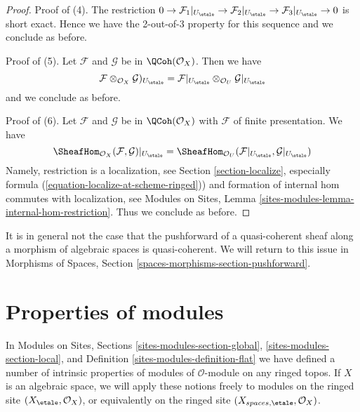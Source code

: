 \begin{proof}
\medskip\noindent
Proof of (4). The restriction
$0 \to \mathcal{F}_1|_{U_\etale} \to \mathcal{F}_2|_{U_\etale}
\to \mathcal{F}_3|_{U_\etale} \to 0$
is short exact. Hence we have the 2-out-of-3 property
for this sequence and we conclude as before.

\medskip\noindent
Proof of (5). Let $\mathcal{F}$ and $\mathcal{G}$ be in $\QCoh(\mathcal{O}_X)$.
Then we have
$$
\mathcal{F} \otimes_{\mathcal{O}_X} \mathcal{G})_{U_\etale} =
\mathcal{F}|_{U_\etale} \otimes_{\mathcal{O}_U} \mathcal{G}|_{U_\etale}
$$
and we conclude as before.

\medskip\noindent
Proof of (6). Let $\mathcal{F}$ and $\mathcal{G}$
be in $\QCoh(\mathcal{O}_X)$ with $\mathcal{F}$
of finite presentation. We have
$$
\SheafHom_{\mathcal{O}_X}(\mathcal{F}, \mathcal{G})|_{U_\etale} =
\SheafHom_{\mathcal{O}_U}(\mathcal{F}|_{U_\etale}, \mathcal{G}|_{U_\etale})
$$
Namely, restriction is a localization, see
Section \ref{section-localize}, especially formula
(\ref{equation-localize-at-scheme-ringed})) and formation of internal
hom commutes with localization, see
Modules on Sites, Lemma \ref{sites-modules-lemma-internal-hom-restriction}.
Thus we conclude as before.
\end{proof}

\noindent
It is in general not the case that the pushforward of a quasi-coherent sheaf
along a morphism of algebraic spaces is quasi-coherent. We will return to this
issue in
Morphisms of Spaces, Section \ref{spaces-morphisms-section-pushforward}.




\section{Properties of modules}
\label{section-properties-modules}

\noindent
In
Modules on Sites, Sections
\ref{sites-modules-section-global},
\ref{sites-modules-section-local}, and
Definition \ref{sites-modules-definition-flat}
we have defined a number of intrinsic properties of modules of
$\mathcal{O}$-module on any ringed topos. If $X$ is an algebraic
space, we will apply these notions freely to modules on the ringed
site $(X_\etale, \mathcal{O}_X)$, or equivalently on the ringed site
$(X_{spaces, \etale}, \mathcal{O}_X)$.

